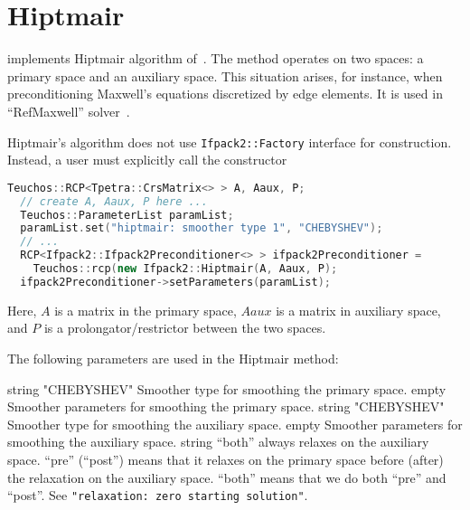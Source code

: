 \section{Hiptmair}

\ifpacktwo{} implements Hiptmair algorithm of~\cite{Hiptmair1997}. The method
operates on two spaces: a primary space and an auxiliary space. This situation
arises, for instance,  when preconditioning Maxwell's equations discretized by
edge elements. It is used in \muelu~\cite{MueLu} ``RefMaxwell''
solver~\cite{RefMaxwell}.

Hiptmair's algorithm does not use \texttt{Ifpack2::Factory} interface for
construction.  Instead, a user must explicitly call the constructor
\begin{lstlisting}[language=C++]
  Teuchos::RCP<Tpetra::CrsMatrix<> > A, Aaux, P;
  // create A, Aaux, P here ...
  Teuchos::ParameterList paramList;
  paramList.set("hiptmair: smoother type 1", "CHEBYSHEV");
  // ...
  RCP<Ifpack2::Ifpack2Preconditioner<> > ifpack2Preconditioner =
    Teuchos::rcp(new Ifpack2::Hiptmair(A, Aaux, P);
  ifpack2Preconditioner->setParameters(paramList);
\end{lstlisting}
\noindent Here, $A$ is a matrix in the primary space, $Aaux$ is a matrix in
auxiliary space, and $P$ is a prolongator/restrictor between the two spaces.

The following parameters are used in the Hiptmair method:

    {string}
    {"CHEBYSHEV"}
    {Smoother type for smoothing the primary space.}
    {\parameterlist}
    {empty}
    {Smoother parameters for smoothing the primary space.}
    {string}
    {"CHEBYSHEV"}
    {Smoother type for smoothing the auxiliary space.}
    {\parameterlist}
    {empty}
    {Smoother parameters for smoothing the auxiliary space.}
    {string}
    {``both''}
    {\ifpacktwo{} always relaxes on the auxiliary space. ``pre'' (``post'') means
     that it relaxes on the primary space before (after) the relaxation on the
     auxiliary space. ``both'' means that we do both ``pre'' and ``post''.}
    {See {\tt "relaxation: zero starting solution"}.}
